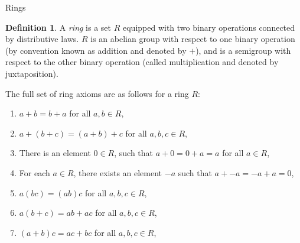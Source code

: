 \documentclass{article}
\theoremstyle{definition}
\newtheorem{definition}{Definition}[section]
\begin{document}
\begin{section}{Rings}
  \begin{definition}
    A \emph{ring} is a set $R$ equipped with two binary operations connected by
    distributive laws. $R$ is an abelian group with respect to one binary
    operation (by convention known as addition and denoted by $+$), and is a
    semigroup with respect to the other binary operation (called multiplication
    and denoted by juxtaposition).

    The full set of ring axioms are as follows for a ring $R$:
    \begin{enumerate}
        \item
          $ a + b = b + a $ for all $ a, b \in R$,
        \item
          $ a + (b + c) = (a + b) + c $ for all $ a, b, c \in R$,
        \item
          There is an element $0 \in R$, such that
          $a + 0 = 0 + a = a$ for all $a \in R$,
        \item
          For each $a \in R$, there exists an element $-a$ such that
          $a + -a = -a + a = 0$,

        \item
          $ a(bc) = (ab)c $ for all $ a, b, c \in R$,

        \item
          $ a(b+c) = ab + ac $ for all $ a, b, c \in R$,
        \item
          $ (a+b)c = ac + bc $ for all $ a, b, c \in R$,

    \end{enumerate}
  \end{definition}

\end{section}
\end{document}
